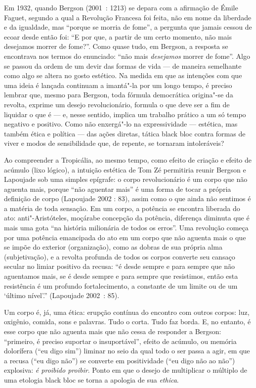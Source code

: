 Em 1932, quando Bergson (2001~: 1213) se depara com a afirmação de Émile
Faguet, segundo a qual a Revolução Francesa foi feita, não em nome da
liberdade e da igualdade, mas ``porque se morria de fome'', a pergunta que
jamais cessou de ecoar desde então foi: ``E por que, a partir de um
certo momento, não mais desejamos morrer de fome?''. Como quase tudo, em
Bergson, a resposta se encontrava nos termos do enunciado: ``não mais
\emph{desejamos }morrer de fome''. Algo se passou da ordem de um devir
das formas de vida --- de maneira semelhante como algo se altera no gosto
estético. Na medida em que as intenções com que uma ideia é lançada
continuam a imantá"-la por um longo tempo, é preciso lembrar que, mesmo
para Bergson, toda fórmula democrática origina"-se da revolta, exprime um
desejo revolucionário, formula o que deve ser a fim de liquidar o que é
--- e, nesse sentido, implica um trabalho prático a um só tempo negativo
e positivo. Como não enxergá"-lo na expressividade --- estética, mas
também ética e política --- das ações diretas, tática black bloc contra
formas de viver e modos de sensibilidade que, de repente, se tornaram
intoleráveis?

Ao compreender a Tropicália, ao mesmo tempo, como efeito de criação e
efeito de acúmulo (lixo lógico), a intuição estética de Tom Zé
permitiria reunir Bergson e Lapoujade sob uma simples epígrafe: o corpo
revolucionário é um corpo que não aguenta mais, porque ``não aguentar
mais'' é uma forma de tocar a própria definição de corpo (Lapoujade 2002
: 83), assim como o que ainda não sentimos é a matéria de toda sensação.
Em um corpo, a potência se encontra liberada do ato: anti"-Aristóteles,
moçárabe concepção da potência, diferença diminuta que é mais uma gota
``na história milionária de todos os erros''. Uma revolução começa por
uma potência emancipada do ato em um corpo que não aguenta mais o que se
impõe do exterior (organização), como as dobras de sua própria alma
(subjetivação), e a revolta profunda de todos os corpos converte seu
cansaço secular no limiar positivo da recusa: ``é desde sempre e para
sempre que não aguentamos mais, se é desde sempre e para sempre que
resistimos, então esta resistência é um profundo fortalecimento, a
constante de um limite ou de um `último nível'.'' (Lapoujade 2002~: 85).

Um corpo é, já, uma ética: erupção contínua do encontro com outros
corpos: luz, oxigênio, comida, sons e palavras. Tudo o corta. Tudo faz
borda. E, no entanto, é esse corpo que não aguenta mais que não cessa de
responder a Bergson: ``primeiro, é preciso suportar o insuportável'',
efeito de acúmulo, ou memória dolorífera (``eu digo sim'') liminar no
seio da qual todo o ser passa a agir, em que a recusa (``eu digo não'')
se converte em positividade (``eu digo não ao não'') explosiva: \emph{é
proibido proibir}. Ponto em que o desejo de multiplicar o múltiplo de
uma etologia black bloc se torna a apologia de sua \emph{ethica}.


